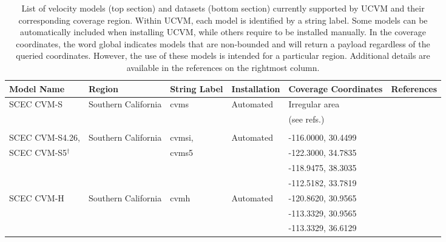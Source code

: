 
\begin{table*}%
\centering
\small
\caption{List of velocity models (top section) and datasets (bottom section) currently supported by UCVM and their corresponding coverage region. Within UCVM, each model is identified by a string label. Some models can be automatically included when installing UCVM, while others require to be installed manually. In the coverage coordinates, the word global indicates models that are non-bounded and will return a payload regardless of the queried coordinates. However, the use of these models is intended for a particular region. Additional details are available in the references on the rightmost column.}
\begin{tabular}[]{llllll}
Model Name         & Region                & String Label & Installation & Coverage Coordinates & References \\
\hline
SCEC CVM-S         & Southern California   & cvms          &  Automated   & Irregular area     & \citet{Magistrale_1996_BSSA} \\
                   &                       &               &              & (see refs.)        & \citet{Magistrale_2000_BSSA} \\
                   &                       &               &              &                    & \citet{Kohler_2003_BSSA}     \\
SCEC CVM-S4.26,    & Southern California   & cvmsi,        &  Automated   & -116.0000, 30.4499 & \citet{Chen_2011_Proc}       \\
SCEC CVM-S5$^\dagger$&                     & cvms5         &              & -122.3000, 34.7835 & \citet{Lee_2014_JGR}         \\
                   &                       &               &              & -118.9475, 38.3035 & \citet{Lee_2014_SRL}         \\
                   &                       &               &              & -112.5182, 33.7819 &                              \\
SCEC CVM-H         & Southern California   & cvmh          &  Automated   & -120.8620, 30.9565 & \citet{Suss_2003_JGR}        \\
                   &                       &               &              & -113.3329, 30.9565 & \citet{Plesch_2011_SCEC}     \\
                   &                       &               &              & -113.3329, 36.6129 & \citet{CVM-H_Manual}         \\

\end{tabular}
\end{table*}
